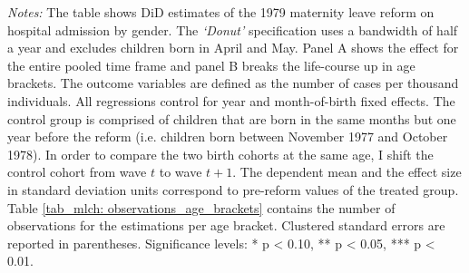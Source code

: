 \begin{landscape}
\begin{table}[H]
\begin{threeparttable}
{\begin{tabular}{l*{12}{c}}
 		\end{tabular}}
 		\begin{tablenotes} 
 			\item \scriptsize \emph{Notes:} The table shows DiD estimates of the 1979 maternity leave reform on hospital admission by gender. The \textit{`Donut'} specification uses a bandwidth of half a year and excludes children born in April and May. Panel A shows the effect for the entire pooled time frame and panel B breaks the life-course up in age brackets. The outcome variables are defined as the number of cases per thousand individuals. All regressions control for year and month-of-birth fixed effects. The control group is comprised of children that are born in the same months but one year before the reform (i.e. children born between November 1977 and October 1978). In order to compare the two birth cohorts at the same age, I shift the control cohort from wave $t$ to wave $t+1$. The dependent mean and the effect size in standard deviation units correspond to pre-reform values of the treated group. Table \ref{tab_mlch: observations_age_brackets} contains the number of observations for the estimations per age bracket. Clustered standard errors are reported in parentheses. \newline Significance levels: * p < 0.10, ** p < 0.05, *** p < 0.01. \newline 	%
 		\end{tablenotes} 
 	\end{threeparttable} 
 \end{table}
\vspace*{\fill}\clearpage 
\end{landscape}
\restoregeometry

% 
